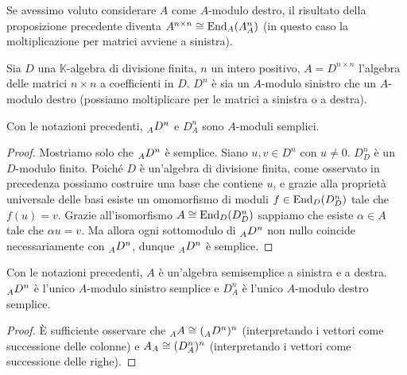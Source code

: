 Se avessimo voluto considerare $A$ come $A$-modulo destro, il risultato della proposizione precedente diventa $A^{n\times n}\cong\operatorname{End}_A(A_A^n)$ (in questo caso la moltiplicazione per matrici avviene a sinistra).


Sia $D$ una $\mathbb{K}$-algebra di divisione finita, $n$ un intero positivo, $A=D^{n\times n}$ l'algebra delle matrici $n\times n$ a coefficienti in $D$. $D^n$ è sia un $A$-modulo sinistro che un $A$-modulo destro (possiamo moltiplicare per le matrici a sinistra o a destra).


\begin{proposition}
Con le notazioni precedenti, $\prescript{}{A}{D^n}$ e $D^n_A$ sono $A$-moduli semplici.
\end{proposition}
\begin{proof}
Mostriamo solo che $\prescript{}{A}{D^n}$ è semplice. Siano $u,v\in D^n$ con $u\neq 0$. $D^n_D$ è un $D$-modulo finito. Poiché $D$ è un'algebra di divisione finita, come osservato in precedenza possiamo costruire una base che contiene $u$, e grazie alla proprietà universale delle basi esiste un omomorfismo di moduli $f\in\operatorname{End}_D(D^n_D)$ tale che $f(u)=v$. Grazie all'isomorfismo $A\cong\operatorname{End}_D(D^n_D)$ sappiamo che esiste $\alpha\in A$ tale che $\alpha u=v$. Ma allora ogni sottomodulo di $\prescript{}{A}{D}^n$ non nullo coincide necessariamente con $\prescript{}{A}{D}^n$, dunque $\prescript{}{A}{D}^n$ è semplice.
\end{proof}


\begin{proposition}
Con le notazioni precedenti, $A$ è un'algebra semisemplice a sinistra e a destra. $\prescript{}{A}{D}^n$ è l'unico $A$-modulo sinistro semplice e $D^n_A$ è l'unico $A$-modulo destro semplice.
\end{proposition}
\begin{proof}
È sufficiente osservare che $\prescript{}{A}{A}\cong(\prescript{}{A}{D}^n)^n$ (interpretando i vettori come successione delle colonne) e $A_A\cong(D^n_A)^n$ (interpretando i vettori come successione delle righe).
\end{proof}


